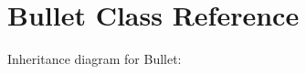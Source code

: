 \hypertarget{classBullet}{}\section{Bullet Class Reference}
\label{classBullet}


Inheritance diagram for Bullet\+:
